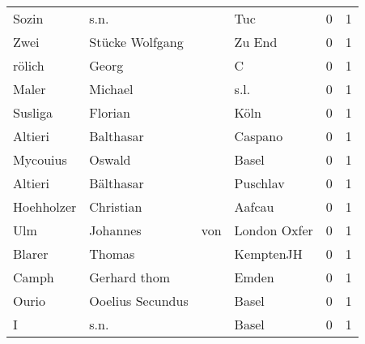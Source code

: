 \begin{center}
\begin{tiny}
\begin{longtabu}{llllrr}
                    Sozin &                               s.n. &             &                                         Tuc &          0 &         1 \\
                     Zwei &                    Stücke Wolfgang &             &                                      Zu End &          0 &         1 \\
                   rölich &                              Georg &             &                                           C &          0 &         1 \\
                    Maler &                            Michael &             &                                        s.l. &          0 &         1 \\
                  Susliga &                            Florian &             &                                        Köln &          0 &         1 \\
                  Altieri &                          Balthasar &             &                                     Caspano &          0 &         1 \\
                 Mycouius &                             Oswald &             &                                       Basel &          0 &         1 \\
                  Altieri &                          Bälthasar &             &                                    Puschlav &          0 &         1 \\
               Hoehholzer &                          Christian &             &                                      Aafcau &          0 &         1 \\
                      Ulm &                           Johannes &         von &                                London Oxfer &          0 &         1 \\
                   Blarer &                             Thomas &             &                                   KemptenJH &          0 &         1 \\
                    Camph &                       Gerhard thom &             &                                       Emden &          0 &         1 \\
                    Ourio &                   Ooelius Secundus &             &                                       Basel &          0 &         1 \\
                        I &                               s.n. &             &                                       Basel &          0 &         1 \\

\end{longtabu}
\end{tiny}
\end{center}
